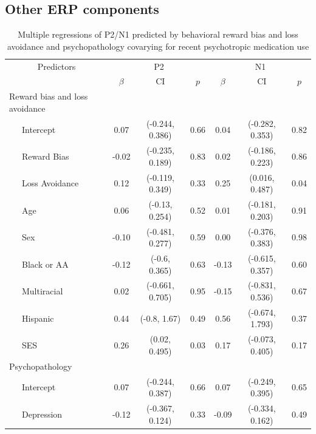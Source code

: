 \documentclass[english,man,floatsintext]{apa6}
\begin{document}
\hypertarget{other-erp-components}{%
\subsection{Other ERP components}\label{other-erp-components}}

\begin{table}[tbp]

\begin{center}
\begin{threeparttable}

\caption{\label{tab:unnamed-chunk-12}Multiple regressions of P2/N1 predicted by behavioral reward bias and loss avoidance and psychopathology covarying for recent psychotropic medication use}

\begin{tabular}{lcccccc}
\toprule
 \multicolumn{1}{c}{Predictors} & \multicolumn{3}{c}{P2} & \multicolumn{3}{c}{N1} \\
\cmidrule(r){1-1} \cmidrule(r){2-4} \cmidrule(r){5-7}
  & $\beta$ & CI & $p$ & $\beta$ & CI & $p$\\
\midrule
Reward bias and loss avoidance &  &  &  &  &  & \\
\ \ \ Intercept & 0.07 & (-0.244, 0.386) & 0.66 & 0.04 & (-0.282, 0.353) & 0.82\\
\ \ \ Reward Bias & -0.02 & (-0.235, 0.189) & 0.83 & 0.02 & (-0.186, 0.223) & 0.86\\
\ \ \ Loss Avoidance & 0.12 & (-0.119, 0.349) & 0.33 & 0.25 & (0.016, 0.487) & 0.04\\
\ \ \ Age & 0.06 & (-0.13, 0.254) & 0.52 & 0.01 & (-0.181, 0.203) & 0.91\\
\ \ \ Sex & -0.10 & (-0.481, 0.277) & 0.59 & 0.00 & (-0.376, 0.383) & 0.98\\
\ \ \ Black or AA & -0.12 & (-0.6, 0.365) & 0.63 & -0.13 & (-0.615, 0.357) & 0.60\\
\ \ \ Multiracial & 0.02 & (-0.661, 0.705) & 0.95 & -0.15 & (-0.831, 0.536) & 0.67\\
\ \ \ Hispanic & 0.44 & (-0.8, 1.67) & 0.49 & 0.56 & (-0.674, 1.793) & 0.37\\
\ \ \ SES & 0.26 & (0.02, 0.495) & 0.03 & 0.17 & (-0.073, 0.405) & 0.17\\
Psychopathology &  &  &  &  &  & \\
\ \ \ Intercept & 0.07 & (-0.244, 0.387) & 0.66 & 0.07 & (-0.249, 0.395) & 0.65\\
\ \ \ Depression & -0.12 & (-0.367, 0.124) & 0.33 & -0.09 & (-0.334, 0.162) & 0.49\\

\end{tabular}
\end{threeparttable}
\end{center}
\end{table}
\end{document}
